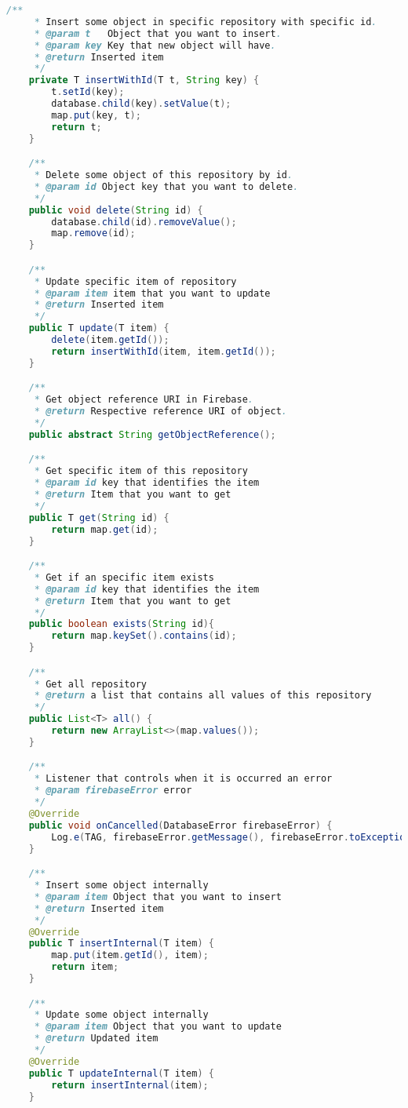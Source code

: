 \begin{lstlisting}[language=java,firstnumber=1]
    /**
     * Insert some object in specific repository with specific id.
     * @param t   Object that you want to insert.
     * @param key Key that new object will have.
     * @return Inserted item
     */
    private T insertWithId(T t, String key) {
        t.setId(key);
        database.child(key).setValue(t);
        map.put(key, t);
        return t;
    }

    /**
     * Delete some object of this repository by id.
     * @param id Object key that you want to delete.
     */
    public void delete(String id) {
        database.child(id).removeValue();
        map.remove(id);
    }

    /**
     * Update specific item of repository
     * @param item item that you want to update
     * @return Inserted item
     */
    public T update(T item) {
        delete(item.getId());
        return insertWithId(item, item.getId());
    }

    /**
     * Get object reference URI in Firebase.
     * @return Respective reference URI of object.
     */
    public abstract String getObjectReference();

    /**
     * Get specific item of this repository
     * @param id key that identifies the item
     * @return Item that you want to get
     */
    public T get(String id) {
        return map.get(id);
    }

    /**
     * Get if an specific item exists
     * @param id key that identifies the item
     * @return Item that you want to get
     */
    public boolean exists(String id){
        return map.keySet().contains(id);
    }

    /**
     * Get all repository
     * @return a list that contains all values of this repository
     */
    public List<T> all() {
        return new ArrayList<>(map.values());
    }

    /**
     * Listener that controls when it is occurred an error
     * @param firebaseError error
     */
    @Override
    public void onCancelled(DatabaseError firebaseError) {
        Log.e(TAG, firebaseError.getMessage(), firebaseError.toException());
    }

    /**
     * Insert some object internally
     * @param item Object that you want to insert
     * @return Inserted item
     */
    @Override
    public T insertInternal(T item) {
        map.put(item.getId(), item);
        return item;
    }

    /**
     * Update some object internally
     * @param item Object that you want to update
     * @return Updated item
     */
    @Override
    public T updateInternal(T item) {
        return insertInternal(item);
    }


\end{lstlisting}
